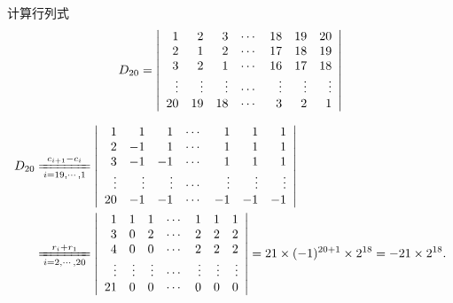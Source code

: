 \begin{frame}
\begin{testexample}
  计算行列式
  $$
  D_{20} = \left|
    \begin{array}{rrrrrrr}
      1   & 2    & 3    & \cdots  & 18    & 19    &  20 \\ 
      2   & 1    & 2    & \cdots  & 17    & 18    &  19 \\
      3   & 2    & 1    & \cdots  & 16    & 17    &  18 \\
      \vdots & \vdots  & \vdots  & \cdots  & \vdots   & \vdots   &  \vdots \\
      20  & 19   & 18   & \cdots  & 3     & 2     &  1
    \end{array}
  \right|
  $$    
\end{testexample} \pause 
\begin{jie}
  $$
  \begin{aligned}
    D_{20} &   \xlongequal[i=19,\cd,1]{c_{i+1}-c_i} 
             \left|
             \begin{array}{rrrrrrr}
               1   & 1    & 1    & \cd  & 1    & 1    &  1 \\ 
               2   & -1   & 1    & \cd  & 1    & 1    &  1 \\
               3   & -1   & -1   & \cd  & 1    & 1    &  1 \\
               \vd & \vd  & \vd  & \cd  & \vd  & \vd  &  \vd \\
               20  & -1   & -1   & \cd  & -1   & -1   &  -1
             \end{array}
                                                        \right| \\ 
           & \xlongequal[i=2,\cd,20]{r_i+r_1} 
             \left|
             \begin{array}{rrrrrrr}
               1   & 1    & 1    & \cd  & 1    & 1    &  1 \\ 
               3   & 0    & 2    & \cd  & 2    & 2    &  2 \\
               4   & 0    & 0    & \cd  & 2    & 2    &  2 \\
               \vd & \vd  & \vd  & \cd  & \vd  & \vd  &  \vd \\
               21  & 0    & 0    & \cd  & 0    & 0    &  0
             \end{array}
                                                        \right|
                                                        = 21 \times (-1)^{20+1} \times 2^{18} = -21 \times 2^{18}.
  \end{aligned}
  $$

\end{jie}
%
\end{frame}

